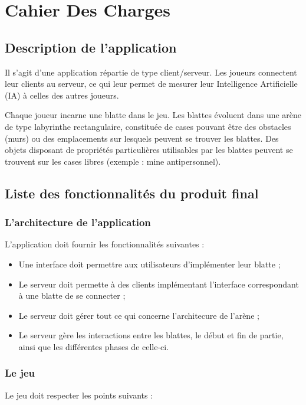 \chapter{Cahier Des Charges}
\thispagestyle{fancy}

\section{Description de l'application}
    Il s'agit d'une application répartie de type client/serveur. Les joueurs connectent leur clients au serveur, ce qui leur permet de mesurer leur Intelligence Artificielle (IA) à celles des autres joueurs.
    
    Chaque joueur incarne une blatte dans le jeu. Les blattes évoluent dans une arène de type labyrinthe rectangulaire, constituée de cases pouvant être des obstacles (murs) ou des emplacements sur lesquels peuvent se trouver les blattes. Des objets disposant de propriétés particulières utilisables par les blattes peuvent se trouvent sur les cases libres (exemple : mine antipersonnel).

\section{Liste des fonctionnalités du produit final}
     \subsection{L'architecture de l'application}
         L'application doit fournir les fonctionnalités suivantes :
         \begin{itemize}
             \item Une interface doit permettre aux utilisateurs d'implémenter leur blatte ;
             \item Le serveur doit permette à des clients implémentant l'interface correspondant à une blatte de se connecter ;
             \item Le serveur doit gérer tout ce qui concerne l'architecure de l'arène ;
             \item Le serveur gère les interactions entre les blattes, le début et fin de partie, ainsi que les différentes phases de celle-ci.
         \end{itemize}
         
\newpage
    \subsection{Le jeu}
        Le jeu doit respecter les points suivants : 
        
